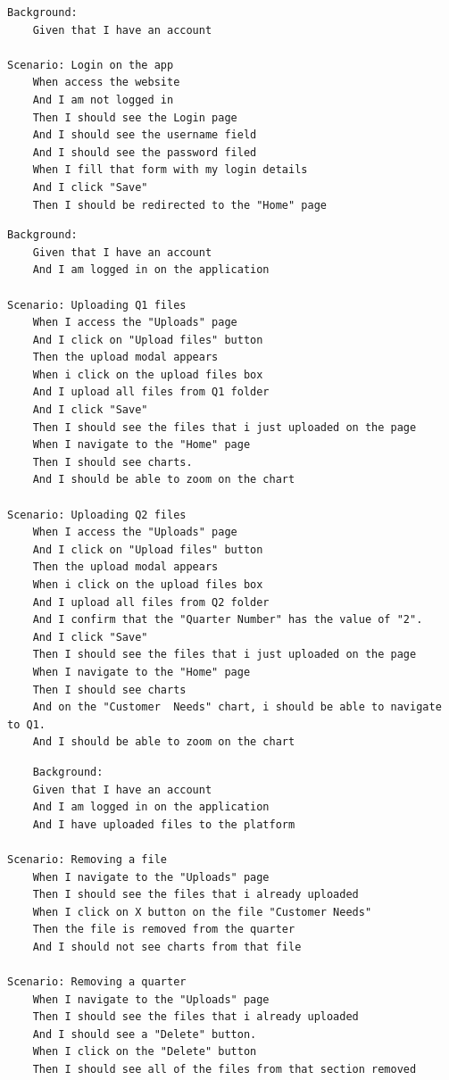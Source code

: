 \begin{verbatim}
Background:
	Given that I have an account

Scenario: Login on the app
	When access the website
	And I am not logged in
	Then I should see the Login page
	And I should see the username field
	And I should see the password filed
	When I fill that form with my login details
	And I click "Save"
	Then I should be redirected to the "Home" page
\end{verbatim}
    
\begin{verbatim}
Background:
	Given that I have an account
	And I am logged in on the application

Scenario: Uploading Q1 files
	When I access the "Uploads" page  
	And I click on "Upload files" button 
	Then the upload modal appears 
	When i click on the upload files box
	And I upload all files from Q1 folder
	And I click "Save"
	Then I should see the files that i just uploaded on the page
	When I navigate to the "Home" page
	Then I should see charts. 
	And I should be able to zoom on the chart
	
Scenario: Uploading Q2 files
	When I access the "Uploads" page  
	And I click on "Upload files" button 
	Then the upload modal appears 
	When i click on the upload files box
	And I upload all files from Q2 folder
	And I confirm that the "Quarter Number" has the value of "2".
	And I click "Save"
	Then I should see the files that i just uploaded on the page
	When I navigate to the "Home" page
	Then I should see charts
	And on the "Customer  Needs" chart, i should be able to navigate to Q1.
	And I should be able to zoom on the chart
\end{verbatim}

\begin{verbatim}
    Background:  
	Given that I have an account
	And I am logged in on the application
	And I have uploaded files to the platform
 
Scenario: Removing a file
	When I navigate to the "Uploads" page  
	Then I should see the files that i already uploaded
	When I click on X button on the file "Customer Needs"
	Then the file is removed from the quarter
	And I should not see charts from that file
	
Scenario: Removing a quarter
	When I navigate to the "Uploads" page  
	Then I should see the files that i already uploaded
	And I should see a "Delete" button.
	When I click on the "Delete" button
	Then I should see all of the files from that section removed 
\end{verbatim}


